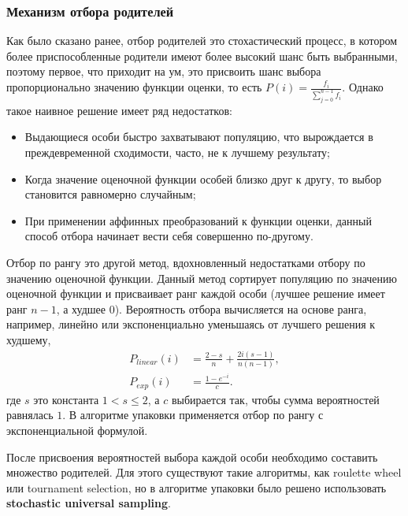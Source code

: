 \documentclass{fefu_thesis/cls/fefu}
\begin{document}
    \subsubsection{Механизм отбора родителей}
    Как было сказано ранее, отбор родителей это стохастический процесс, в котором более приспособленные родители имеют более высокий шанс быть выбранными, поэтому первое, что приходит на ум, это присвоить шанс выбора пропорционально значению функции оценки, то есть $P\left(i\right) = \frac{f_i}{\sum_{j=0}^{n - 1} f_i}$. Однако такое наивное решение имеет ряд недостатков:
    \begin{itemize}
        \item Выдающиеся особи быстро захватывают популяцию, что вырождается в преждевременной сходимости, часто, не к лучшему результату;
        \item Когда значение оценочной функции особей близко друг к другу, то выбор становится равномерно случайным;
        \item При применении аффинных преобразований к функции оценки, данный способ отбора начинает вести себя совершенно по-другому.
    \end{itemize}

    Отбор по рангу\cite{RankingSelection} это другой метод, вдохновленный недостатками отбору по значению оценочной функции. Данный метод сортирует популяцию по значению оценочной функции и присваивает ранг каждой особи (лучшее решение имеет ранг $n - 1$, а худшее $0$). Вероятность отбора вычисляется на основе ранга, например, линейно или экспоненциально уменьшаясь от лучшего решения к худшему,
    \begin{align*}
        P_{linear}\left(i\right) &= \frac{2 - s}{n} + \frac{2i\left(s - 1\right)}{n\left(n - 1\right)},\\
        P_{exp}\left(i\right) &= \frac{1 - e^{-i}}{c}.
    \end{align*}
    где $s$ это константа $1 < s\leq 2$, а $c$ выбирается так, чтобы сумма вероятностей равнялась $1$. В алгоритме упаковки применяется отбор по рангу с экспоненциальной формулой.

    После присвоения вероятностей выбора каждой особи необходимо составить множество родителей. Для этого существуют такие алгоритмы, как roulette wheel или tournament selection, но в алгоритме упаковки было решено использовать \textbf{stochastic universal sampling}\cite{RankingSelection}.
\end{document}
